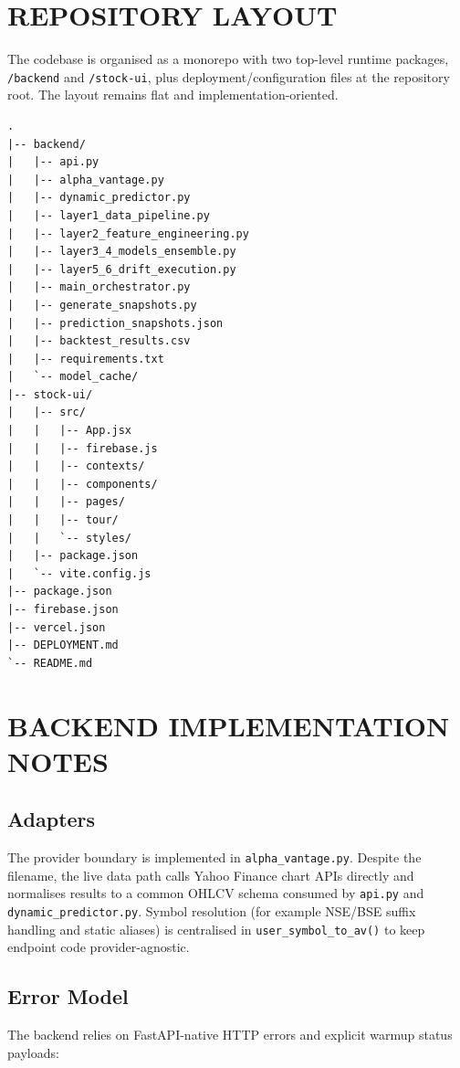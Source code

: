 \documentclass[12pt,a4paper]{report}
\numberwithin{equation}{chapter}
\begin{document}
\section{REPOSITORY LAYOUT}

The codebase is organised as a monorepo with two top-level runtime packages, \texttt{/backend} and \texttt{/stock-ui}, plus deployment/configuration files at the repository root. The layout remains flat and implementation-oriented.

\begin{lstlisting}[breaklines=true]
.
|-- backend/
|   |-- api.py
|   |-- alpha_vantage.py
|   |-- dynamic_predictor.py
|   |-- layer1_data_pipeline.py
|   |-- layer2_feature_engineering.py
|   |-- layer3_4_models_ensemble.py
|   |-- layer5_6_drift_execution.py
|   |-- main_orchestrator.py
|   |-- generate_snapshots.py
|   |-- prediction_snapshots.json
|   |-- backtest_results.csv
|   |-- requirements.txt
|   `-- model_cache/
|-- stock-ui/
|   |-- src/
|   |   |-- App.jsx
|   |   |-- firebase.js
|   |   |-- contexts/
|   |   |-- components/
|   |   |-- pages/
|   |   |-- tour/
|   |   `-- styles/
|   |-- package.json
|   `-- vite.config.js
|-- package.json
|-- firebase.json
|-- vercel.json
|-- DEPLOYMENT.md
`-- README.md
\end{lstlisting}

\section{BACKEND IMPLEMENTATION NOTES}

\subsection{Adapters}

The provider boundary is implemented in \texttt{alpha\_vantage.py}. Despite the filename, the live data path calls Yahoo Finance chart APIs directly and normalises results to a common OHLCV schema consumed by \texttt{api.py} and \texttt{dynamic\_predictor.py}. Symbol resolution (for example NSE/BSE suffix handling and static aliases) is centralised in \texttt{user\_symbol\_to\_av()} to keep endpoint code provider-agnostic.

\subsection{Error Model}

The backend relies on FastAPI-native HTTP errors and explicit warmup status payloads:
\end{document}
